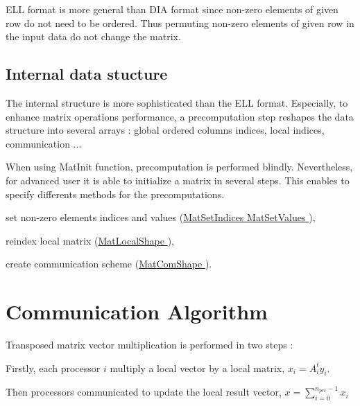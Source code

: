 \begin{DoxyItemize}
\item E\-L\-L format is more general than D\-I\-A format since non-\/zero elements of given row do not need to be ordered. Thus permuting non-\/zero elements of given row in the input data do not change the matrix.
\end{DoxyItemize}\hypertarget{data_struct_parall_intern_struct}{}\subsection{Internal data stucture}\label{data_struct_parall_intern_struct}
The internal structure is more sophisticated than the E\-L\-L format. Especially, to enhance matrix operations performance, a precomputation step reshapes the data structure into several arrays \-: global ordered columns indices, local indices, communication ...

When using Mat\-Init function, precomputation is performed blindly. Nevertheless, for advanced user it is able to initialize a matrix in several steps. This enables to specify differents methods for the precomputations.
\begin{DoxyItemize}
\item set non-\/zero elements indices and values (\hyperlink{group__matmap__group11_gaaf26c7678367e6757392c03abd22a105}{Mat\-Set\-Indices } \hyperlink{}{Mat\-Set\-Values }),
\item reindex local matrix (\hyperlink{group__matmap__group11_gae31f7ccb10cda5c97e49f640feed1ad4}{Mat\-Local\-Shape }),
\item create communication scheme (\hyperlink{group__matmap__group11_ga61b3b348d7c039aadfc3196e6b83535a}{Mat\-Com\-Shape }).
\end{DoxyItemize}

\par
 \hypertarget{algorithm}{}\section{Communication Algorithm}\label{algorithm}
Transposed matrix vector multiplication is performed in two steps \-:
\begin{DoxyItemize}
\item Firstly, each processor $ i $ multiply a local vector by a local matrix, $ x_i=A_i^t y_i$.
\item Then processors communicated to update the local result vector, $ x = \sum_{i=0}^{n_{prc}-1} x_i $
\end{DoxyItemize}

